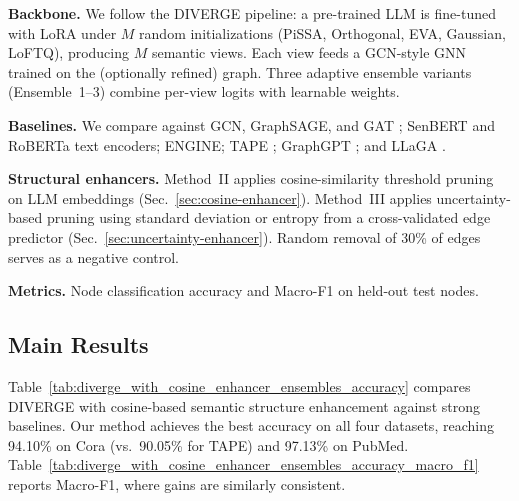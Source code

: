 \documentclass{article}
\begin{document}
\textbf{Backbone.} We follow the DIVERGE pipeline: a pre-trained LLM is fine-tuned with
LoRA under $M$ random initializations (PiSSA, Orthogonal, EVA, Gaussian, LoFTQ),
producing $M$ semantic views. Each view feeds a GCN-style GNN trained on the (optionally
refined) graph. Three adaptive ensemble variants (Ensemble~1--3) combine per-view logits
with learnable weights.

\textbf{Baselines.} We compare against GCN, GraphSAGE, and GAT
\citep{Kipf2016GCN,hamilton2017sage,Velickovic2018GAT}; SenBERT and RoBERTa text
encoders; ENGINE; TAPE \citep{he2024harnessing}; GraphGPT \citep{tang2024graphgpt};
and LLaGA \citep{Chen2024LLaGA}.

\textbf{Structural enhancers.} Method~II applies cosine-similarity threshold pruning on
LLM embeddings (Sec.~\ref{sec:cosine-enhancer}). Method~III applies uncertainty-based
pruning using standard deviation or entropy from a cross-validated edge predictor
(Sec.~\ref{sec:uncertainty-enhancer}). Random removal of 30\% of edges serves as a
negative control.

\textbf{Metrics.} Node classification accuracy and Macro-F1 on held-out test nodes.


\subsection{Main Results}
Table~\ref{tab:diverge_with_cosine_enhancer_ensembles_accuracy} compares DIVERGE with
cosine-based semantic structure enhancement against strong baselines. Our method achieves
the best accuracy on all four datasets, reaching 94.10\% on Cora (vs.\ 90.05\% for TAPE)
and 97.13\% on PubMed. Table~\ref{tab:diverge_with_cosine_enhancer_ensembles_accuracy_macro_f1}
reports Macro-F1, where gains are similarly consistent.
\end{document}
